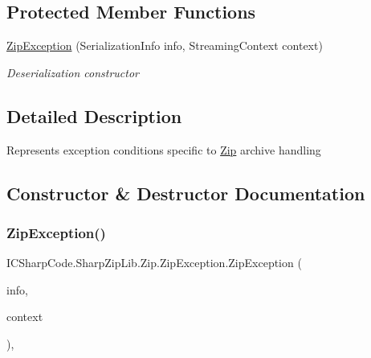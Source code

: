 \subsection*{Protected Member Functions}
\begin{DoxyCompactItemize}
\item 
\hyperlink{class_i_c_sharp_code_1_1_sharp_zip_lib_1_1_zip_1_1_zip_exception_a89b61f0e1bdef3cd1f6458ce2cf5416c}{Zip\+Exception} (Serialization\+Info info, Streaming\+Context context)
\begin{DoxyCompactList}\small\item\em Deserialization constructor \end{DoxyCompactList}\end{DoxyCompactItemize}


\subsection{Detailed Description}
Represents exception conditions specific to \hyperlink{namespace_i_c_sharp_code_1_1_sharp_zip_lib_1_1_zip}{Zip} archive handling 



\subsection{Constructor \& Destructor Documentation}
\mbox{\label{class_i_c_sharp_code_1_1_sharp_zip_lib_1_1_zip_1_1_zip_exception_a89b61f0e1bdef3cd1f6458ce2cf5416c}} 
\subsubsection{\texorpdfstring{Zip\+Exception()}{ZipException()}\hspace{0.1cm}{\footnotesize\ttfamily [1/4]}}
{\footnotesize\ttfamily I\+C\+Sharp\+Code.\+Sharp\+Zip\+Lib.\+Zip.\+Zip\+Exception.\+Zip\+Exception (\begin{DoxyParamCaption}\item[{Serialization\+Info}]{info,  }\item[{Streaming\+Context}]{context }\end{DoxyParamCaption})\hspace{0.3cm}{\ttfamily [inline]}, {\ttfamily [protected]}}



